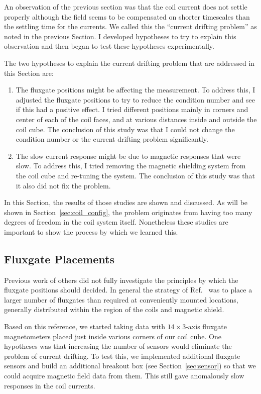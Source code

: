 An observation of the previous section was that the coil current does
not settle properly although the field seems to be compensated on
shorter timescales than the settling time for the currents.  We called
this the ``current drifting problem'' as noted in the previous
Section.  I developed hypotheses to try to explain this observation
and then began to test these hypotheses experimentally.

The two hypotheses to explain the current drifting problem that are
addressed in this Section are:
\begin{enumerate}
\item The fluxgate positions might be affecting the measurement.   To address this, I adjusted the fluxgate positions to try to reduce the condition number and see if this had a positive effect.  I tried different positions mainly in
corners and center of each of the coil faces, and at various distances
inside and outside the coil cube.  The conclusion of this study was
that I could not change the condition number or the current drifting
problem significantly.
\item The slow current response might be due to magnetic responses that were slow.
To address this, I tried removing the magnetic shielding system from
the coil cube and re-tuning the system.  The conclusion of this study
was that it also did not fix the problem.
\end{enumerate}
In this Section, the results of those studies are shown and discussed.
As will be shown in Section~\ref{sec:coil_config}, the problem
originates from having too many degrees of freedom in the coil system
itself.  Nonetheless these studies are important to show the process
by which we learned this.

\subsection{Fluxgate Placements}

Previous work of others did not fully investigate the principles by
which the fluxgate positions should decided.  In general the strategy
of Ref.~\cite{bea} was to place a larger number of
fluxgates than required at conveniently mounted locations, generally
distributed within the region of the coils and magnetic shield.

Based on this reference, we started taking data with $14\times 3$-axis fluxgate
magnetometers placed just inside various corners of our coil cube.
One hypotheses was that increasing the number of sensors would
eliminate the problem of current drifting. To test this, we
implemented additional fluxgate sensors and build an additional
breakout box (see Section~\ref{sec:sensor}) so that we could acquire
magnetic field data from them.  This still gave anomalously slow
responses in the coil currents.


